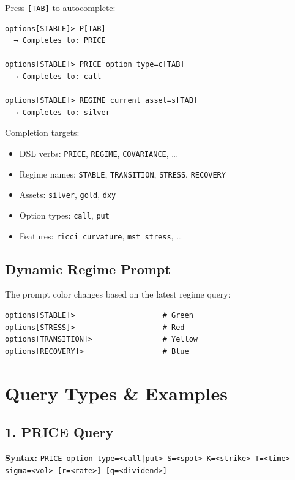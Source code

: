 \documentclass[12pt,oneside,openany]{book}
\begin{document}
Press \texttt{[TAB]} to autocomplete:

\begin{lstlisting}
options[STABLE]> P[TAB]
  → Completes to: PRICE

options[STABLE]> PRICE option type=c[TAB]
  → Completes to: call

options[STABLE]> REGIME current asset=s[TAB]
  → Completes to: silver
\end{lstlisting}

Completion targets:
\begin{itemize}
    \item DSL verbs: \texttt{PRICE}, \texttt{REGIME}, \texttt{COVARIANCE}, \ldots
    \item Regime names: \texttt{STABLE}, \texttt{TRANSITION}, \texttt{STRESS}, \texttt{RECOVERY}
    \item Assets: \texttt{silver}, \texttt{gold}, \texttt{dxy}
    \item Option types: \texttt{call}, \texttt{put}
    \item Features: \texttt{ricci\_curvature}, \texttt{mst\_stress}, \ldots
\end{itemize}

\subsection{Dynamic Regime Prompt}

The prompt color changes based on the latest regime query:

\begin{lstlisting}
options[STABLE]>                    # Green
options[STRESS]>                    # Red
options[TRANSITION]>                # Yellow
options[RECOVERY]>                  # Blue
\end{lstlisting}

\section{Query Types \& Examples}

\subsection{1. PRICE Query}

\textbf{Syntax:} \texttt{PRICE option type=<call|put> S=<spot> K=<strike> T=<time> sigma=<vol> [r=<rate>] [q=<dividend>]}
\end{document}
